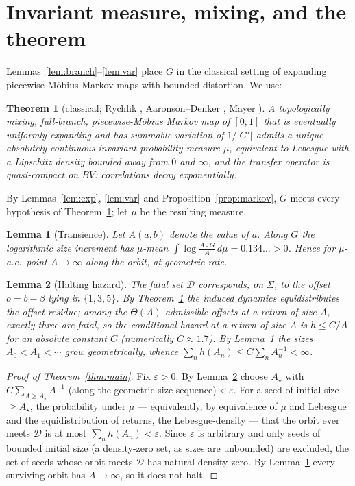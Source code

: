 \documentclass[11pt]{article}
\newtheorem{theorem}{Theorem}\newtheorem{lemma}{Lemma}
\theoremstyle{definition}\newtheorem{definition}{Definition}
\theoremstyle{remark}\newtheorem{remark}{Remark}
\begin{document}
\section{Invariant measure, mixing, and the theorem}
Lemmas~\ref{lem:branch}--\ref{lem:var} place $G$ in the classical setting
of expanding piecewise-M\"obius Markov maps with bounded distortion. We use:

\begin{theorem}[classical; Rychlik \cite{Rychlik}, Aaronson--Denker \cite{AD}, Mayer \cite{Mayer}]\label{thm:acim}
A topologically mixing, full-branch, piecewise-M\"obius Markov map of
$[0,1]$ that is eventually uniformly expanding and has summable variation
of $1/|G'|$ admits a unique absolutely continuous invariant probability
measure $\mu$, equivalent to Lebesgue with a Lipschitz density bounded away
from $0$ and $\infty$, and the transfer operator is quasi-compact on $BV$:
correlations decay exponentially.
\end{theorem}

By Lemmas~\ref{lem:exp}, \ref{lem:var} and Proposition~\ref{prop:markov},
$G$ meets every hypothesis of Theorem~\ref{thm:acim}; let $\mu$ be the
resulting measure.

\begin{lemma}[Transience]\label{lem:drift}
Let $A(a,b)$ denote the value of $a$. Along $G$ the logarithmic size
increment has $\mu$-mean $\displaystyle\int \log\frac{A\circ G}{A}\,d\mu
= 0.134\ldots>0$. Hence for $\mu$-a.e.\ point $A\to\infty$ along the orbit,
at geometric rate.
\end{lemma}

\begin{lemma}[Halting hazard]\label{lem:hazard}
The fatal set $\mathcal D$ corresponds, on $\Sigma$, to the offset
$o=b-\beta$ lying in $\{1,3,5\}$. By Theorem~\ref{thm:acim} the induced
dynamics equidistributes the offset residue; among the $\Theta(A)$ admissible
offsets at a return of size $A$, exactly three are fatal, so the conditional
hazard at a return of size $A$ is $h\le C/A$ for an absolute constant $C$
(numerically $C\approx1.7$). By Lemma~\ref{lem:drift} the sizes
$A_0<A_1<\cdots$ grow geometrically, whence
$\sum_n h(A_n)\le C\sum_n A_n^{-1}<\infty$.
\end{lemma}

\begin{proof}[Proof of Theorem~\ref{thm:main}]
Fix $\varepsilon>0$. By Lemma~\ref{lem:hazard} choose $A_\star$ with
$C\sum_{A\ge A_\star}A^{-1}$ (along the geometric size sequence)$<\varepsilon$.
For a seed of initial size $\ge A_\star$, the probability under $\mu$ --- equivalently,
by equivalence of $\mu$ and Lebesgue and the equidistribution of returns, the
Lebesgue-density --- that the orbit ever meets $\mathcal D$ is at most
$\sum_n h(A_n)<\varepsilon$. Since $\varepsilon$ is arbitrary and only seeds
of bounded initial size (a density-zero set, as sizes are unbounded) are
excluded, the set of seeds whose orbit meets $\mathcal D$ has natural density
zero. By Lemma~\ref{lem:drift} every surviving orbit has $A\to\infty$, so it
does not halt.
\end{proof}
\end{document}
